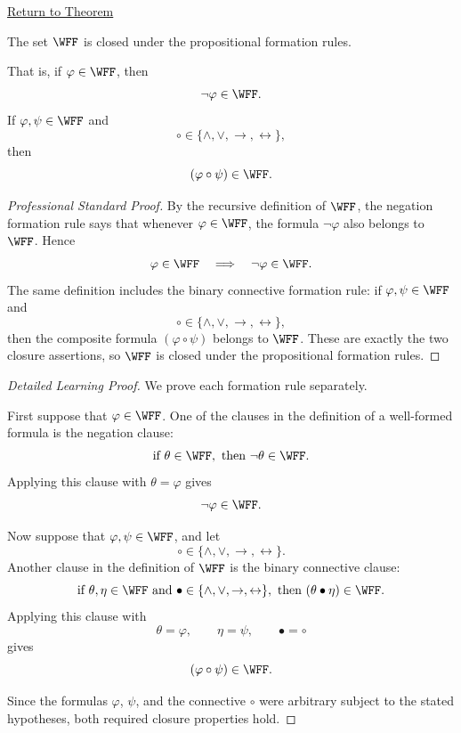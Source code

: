 \newpage
{}
\label{prf:closure-under-formation-propositional-formulas}

\begin{remark*}[Return]
\hyperref[lem:closure-under-formation-propositional-formulas]{Return to Theorem}
\end{remark*}


\begin{lemma*}
The set \(\WFF\) is closed under the propositional formation rules.

That is, if \(\varphi\in\WFF\), then
\[
\neg\varphi\in\WFF.
\]
If \(\varphi,\psi\in\WFF\) and
\[
\circ\in\{\land,\lor,\to,\leftrightarrow\},
\]
then
\[
(\varphi\circ\psi)\in\WFF.
\]
\end{lemma*}

\begin{proof}[Professional Standard Proof]
\LRAProofBodyStart
By the recursive definition of \(\WFF\), the negation formation rule says
that whenever \(\varphi\in\WFF\), the formula \(\neg\varphi\) also belongs
to \(\WFF\). Hence
\[
\varphi\in\WFF
\quad\Longrightarrow\quad
\neg\varphi\in\WFF.
\]
The same definition includes the binary connective formation rule: if
\(\varphi,\psi\in\WFF\) and
\[
\circ\in\{\land,\lor,\to,\leftrightarrow\},
\]
then the composite formula \((\varphi\circ\psi)\) belongs to \(\WFF\).
These are exactly the two closure assertions, so \(\WFF\) is closed under
the propositional formation rules.
\end{proof}

\begin{proof}[Detailed Learning Proof]
\LRAProofBodyStart
We prove each formation rule separately.

First suppose that \(\varphi\in\WFF\). One of the clauses in the definition
of a well-formed formula is the negation clause:
\[
\text{if } \theta\in\WFF,\text{ then } \neg\theta\in\WFF.
\]
Applying this clause with \(\theta=\varphi\) gives
\[
\neg\varphi\in\WFF.
\]

Now suppose that \(\varphi,\psi\in\WFF\), and let
\[
\circ\in\{\land,\lor,\to,\leftrightarrow\}.
\]
Another clause in the definition of \(\WFF\) is the binary connective
clause:
\[
\text{if } \theta,\eta\in\WFF
\text{ and }
\bullet\in\{\land,\lor,\to,\leftrightarrow\},
\text{ then } (\theta\bullet\eta)\in\WFF.
\]
Applying this clause with
\[
\theta=\varphi,\qquad \eta=\psi,\qquad \bullet=\circ
\]
gives
\[
(\varphi\circ\psi)\in\WFF.
\]

Since the formulas \(\varphi\), \(\psi\), and the connective \(\circ\) were
arbitrary subject to the stated hypotheses, both required closure properties
hold.
\end{proof}


